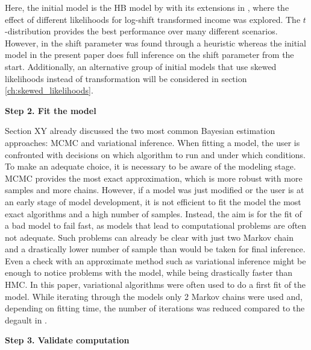 
Here, the initial model is the HB model by \cite{molina_small_2014} with its extensions in \cite{morelli_hierarchical_2021}, where the effect of different likelihoods for log-shift transformed income was explored.
The $t$-distribution provides the best performance over many different scenarios.
However, in \cite{morelli_hierarchical_2021} the shift parameter was found through a heuristic whereas
the initial model in the present paper does full inference on the shift parameter from the start.
Additionally, an alternative group of initial models that use skewed likelihoods instead of transformation will be considered in section \ref{ch:skewed_likelihoods}.



\textbf{Step 2. Fit the model}

Section XY already discussed the two most common Bayesian estimation approaches: MCMC and variational inference.
When fitting a model, the user is confronted with decisions on which algorithm to run and under which conditions.
To make an adequate choice, it is necessary to be aware of the modeling stage.
MCMC provides the most exact approximation, which is more robust with more samples and more chains.
However, if a model was just modified or the user is at an early stage of model development, it is not efficient to fit the model the most exact algorithms and a high number of samples.
Instead, the aim is for the fit of a bad model to fail fast, as models that lead to computational problems are often not adequate.
Such problems can already be clear with just two Markov chain and a drastically lower number of sample than would be taken for final inference.
Even a check with an approximate method such as variational inference might be enough to notice problems with the model, while being drastically faster than HMC.
In this paper, variational algorithms were often used to do a first fit of the model.
While iterating through the models only 2 Markov chains were used and, depending on fitting time, the number of iterations was reduced compared to the degault in .


\textbf{Step 3. Validate computation}

